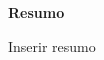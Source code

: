 \begin{center}
	\begin{minipage}[h]{0.7\linewidth}
		\begin{center}
			\textbf{Resumo}
		\end{center} 
		
		Inserir resumo
	\end{minipage}
\end{center}